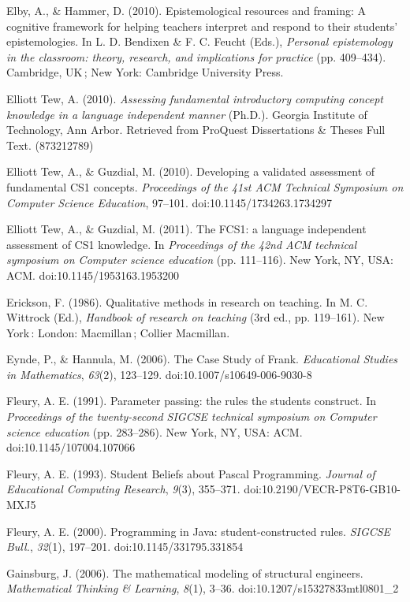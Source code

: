 Elby, A., \& Hammer, D. (2010). Epistemological resources and framing: A
cognitive framework for helping teachers interpret and respond to their
students' epistemologies. In L. D. Bendixen \& F. C. Feucht (Eds.),
\emph{Personal epistemology in the classroom: theory, research, and
implications for practice} (pp. 409--434). Cambridge, UK ; New York:
Cambridge University Press.

Elliott Tew, A. (2010). \emph{Assessing fundamental introductory
computing concept knowledge in a language independent manner} (Ph.D.).
Georgia Institute of Technology, Ann Arbor. Retrieved from ProQuest
Dissertations \& Theses Full Text. (873212789)

Elliott Tew, A., \& Guzdial, M. (2010). Developing a validated
assessment of fundamental CS1 concepts. \emph{Proceedings of the 41st
ACM Technical Symposium on Computer Science Education}, 97--101.
doi:10.1145/1734263.1734297

Elliott Tew, A., \& Guzdial, M. (2011). The FCS1: a language independent
assessment of CS1 knowledge. In \emph{Proceedings of the 42nd ACM
technical symposium on Computer science education} (pp. 111--116). New
York, NY, USA: ACM. doi:10.1145/1953163.1953200

Erickson, F. (1986). Qualitative methods in research on teaching. In M.
C. Wittrock (Ed.), \emph{Handbook of research on teaching} (3rd ed., pp.
119--161). New York : London: Macmillan ; Collier Macmillan.

Eynde, P., \& Hannula, M. (2006). The Case Study of Frank.
\emph{Educational Studies in Mathematics}, \emph{63}(2), 123--129.
doi:10.1007/s10649-006-9030-8

Fleury, A. E. (1991). Parameter passing: the rules the students
construct. In \emph{Proceedings of the twenty-second SIGCSE technical
symposium on Computer science education} (pp. 283--286). New York, NY,
USA: ACM. doi:10.1145/107004.107066

Fleury, A. E. (1993). Student Beliefs about Pascal Programming.
\emph{Journal of Educational Computing Research}, \emph{9}(3), 355--371.
doi:10.2190/VECR-P8T6-GB10-MXJ5

Fleury, A. E. (2000). Programming in Java: student-constructed rules.
\emph{SIGCSE Bull.}, \emph{32}(1), 197--201. doi:10.1145/331795.331854

Gainsburg, J. (2006). The mathematical modeling of structural engineers.
\emph{Mathematical Thinking \& Learning}, \emph{8}(1), 3--36.
doi:10.1207/s15327833mtl0801\_2

